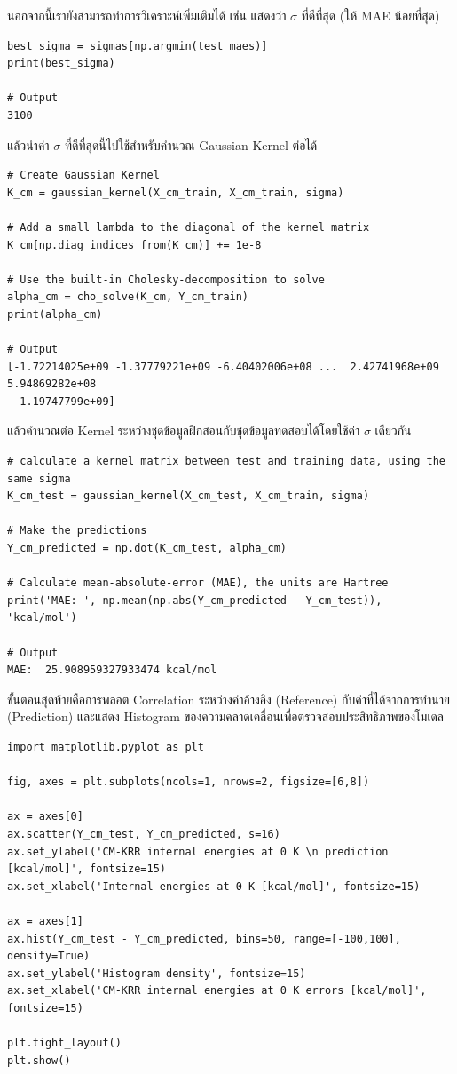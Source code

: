 นอกจากนี้เรายังสามารถทำการวิเคราะห์เพิ่มเติมได้ เช่น แสดงว่า $\sigma$ ที่ดีที่สุด (ให้ MAE น้อยที่สุด)

\begin{lstlisting}[style=MyPython]
best_sigma = sigmas[np.argmin(test_maes)]
print(best_sigma)

# Output
3100
\end{lstlisting}

\noindent แล้วนำค่า $\sigma$ ที่ดีที่สุดนี้ไปใช้สำหรับคำนวณ Gaussian Kernel ต่อได้

\begin{lstlisting}[style=MyPython]
# Create Gaussian Kernel
K_cm = gaussian_kernel(X_cm_train, X_cm_train, sigma)

# Add a small lambda to the diagonal of the kernel matrix
K_cm[np.diag_indices_from(K_cm)] += 1e-8

# Use the built-in Cholesky-decomposition to solve
alpha_cm = cho_solve(K_cm, Y_cm_train)
print(alpha_cm)

# Output
[-1.72214025e+09 -1.37779221e+09 -6.40402006e+08 ...  2.42741968e+09  5.94869282e+08
 -1.19747799e+09]
\end{lstlisting}

\noindent แล้วคำนวณต่อ Kernel ระหว่างชุดข้อมูลฝึกสอนกับชุดข้อมูลทดสอบได้โดยใช้ค่า $\sigma$ เดียวกัน

\begin{lstlisting}[style=MyPython]
# calculate a kernel matrix between test and training data, using the same sigma
K_cm_test = gaussian_kernel(X_cm_test, X_cm_train, sigma)

# Make the predictions
Y_cm_predicted = np.dot(K_cm_test, alpha_cm)

# Calculate mean-absolute-error (MAE), the units are Hartree
print('MAE: ', np.mean(np.abs(Y_cm_predicted - Y_cm_test)), 'kcal/mol')

# Output
MAE:  25.908959327933474 kcal/mol
\end{lstlisting}

ขั้นตอนสุดท้ายคือการพลอต Correlation ระหว่างค่าอ้างอิง (Reference) กับค่าที่ได้จากการทำนาย (Prediction) และแสดง Histogram 
ของความคลาดเคลื่อนเพื่อตรวจสอบประสิทธิภาพของโมเดล

\begin{lstlisting}[style=MyPython]
import matplotlib.pyplot as plt

fig, axes = plt.subplots(ncols=1, nrows=2, figsize=[6,8])

ax = axes[0]
ax.scatter(Y_cm_test, Y_cm_predicted, s=16)
ax.set_ylabel('CM-KRR internal energies at 0 K \n prediction [kcal/mol]', fontsize=15)
ax.set_xlabel('Internal energies at 0 K [kcal/mol]', fontsize=15)

ax = axes[1]
ax.hist(Y_cm_test - Y_cm_predicted, bins=50, range=[-100,100], density=True)
ax.set_ylabel('Histogram density', fontsize=15)
ax.set_xlabel('CM-KRR internal energies at 0 K errors [kcal/mol]', fontsize=15)

plt.tight_layout()
plt.show()
\end{lstlisting}

